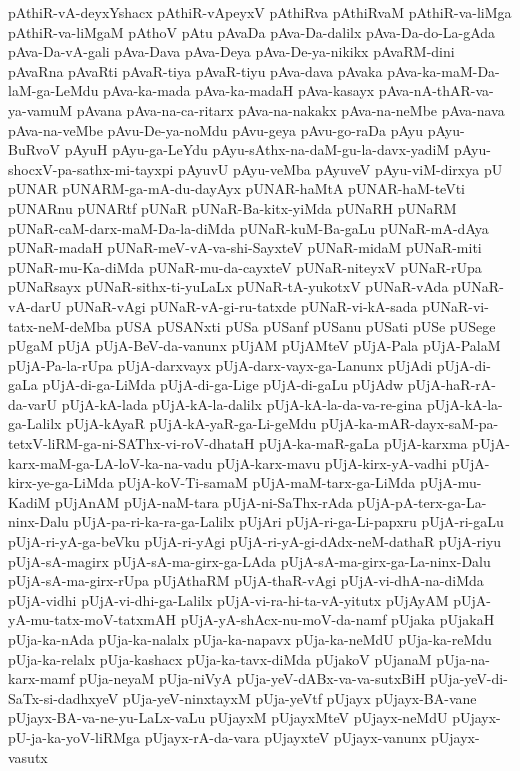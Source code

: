 {pAthiR-vA-deyxYshacx
pAthiR-vApeyxV
pAthiRva
pAthiRvaM
pAthiR-va-liMga
pAthiR-va-liMgaM
pAthoV
pAtu
pAvaDa
pAva-Da-dalilx
pAva-Da-do-La-gAda
pAva-Da-vA-gali
pAva-Dava
pAva-Deya
pAva-De-ya-nikikx
pAvaRM-dini
pAvaRna
pAvaRti
pAvaR-tiya
pAvaR-tiyu
pAva-dava
pAvaka
pAva-ka-maM-Da-laM-ga-LeMdu
pAva-ka-mada
pAva-ka-madaH
pAva-kasayx
pAva-nA-thAR-va-ya-vamuM
pAvana
pAva-na-ca-ritarx
pAva-na-nakakx
pAva-na-neMbe
pAva-nava
pAva-na-veMbe
pAvu-De-ya-noMdu
pAvu-geya
pAvu-go-raDa
pAyu
pAyu-BuRvoV
pAyuH
pAyu-ga-LeYdu
pAyu-sAthx-na-daM-gu-la-davx-yadiM
pAyu-shocxV-pa-sathx-mi-tayxpi
pAyuvU
pAyu-veMba
pAyuveV
pAyu-viM-dirxya
pU
pUNAR
pUNARM-ga-mA-du-dayAyx
pUNAR-haMtA
pUNAR-haM-teVti
pUNARnu
pUNARtf
pUNaR
pUNaR-Ba-kitx-yiMda
pUNaRH
pUNaRM
pUNaR-caM-darx-maM-Da-la-diMda
pUNaR-kuM-Ba-gaLu
pUNaR-mA-dAya
pUNaR-madaH
pUNaR-meV-vA-va-shi-SayxteV
pUNaR-midaM
pUNaR-miti
pUNaR-mu-Ka-diMda
pUNaR-mu-da-cayxteV
pUNaR-niteyxV
pUNaR-rUpa
pUNaRsayx
pUNaR-sithx-ti-yuLaLx
pUNaR-tA-yukotxV
pUNaR-vAda
pUNaR-vA-darU
pUNaR-vAgi
pUNaR-vA-gi-ru-tatxde
pUNaR-vi-kA-sada
pUNaR-vi-tatx-neM-deMba
pUSA
pUSANxti
pUSa
pUSanf
pUSanu
pUSati
pUSe
pUSege
pUgaM
pUjA
pUjA-BeV-da-vanunx
pUjAM
pUjAMteV
pUjA-Pala
pUjA-PalaM
pUjA-Pa-la-rUpa
pUjA-darxvayx
pUjA-darx-vayx-ga-Lanunx
pUjAdi
pUjA-di-gaLa
pUjA-di-ga-LiMda
pUjA-di-ga-Lige
pUjA-di-gaLu
pUjAdw
pUjA-haR-rA-da-varU
pUjA-kA-lada
pUjA-kA-la-dalilx
pUjA-kA-la-da-va-re-gina
pUjA-kA-la-ga-Lalilx
pUjA-kAyaR
pUjA-kA-yaR-ga-Li-geMdu
pUjA-ka-mAR-dayx-saM-pa-tetxV-liRM-ga-ni-SAThx-vi-roV-dhataH
pUjA-ka-maR-gaLa
pUjA-karxma
pUjA-karx-maM-ga-LA-loV-ka-na-vadu
pUjA-karx-mavu
pUjA-kirx-yA-vadhi
pUjA-kirx-ye-ga-LiMda
pUjA-koV-Ti-samaM
pUjA-maM-tarx-ga-LiMda
pUjA-mu-KadiM
pUjAnAM
pUjA-naM-tara
pUjA-ni-SaThx-rAda
pUjA-pA-terx-ga-La-ninx-Dalu
pUjA-pa-ri-ka-ra-ga-Lalilx
pUjAri
pUjA-ri-ga-Li-papxru
pUjA-ri-gaLu
pUjA-ri-yA-ga-beVku
pUjA-ri-yAgi
pUjA-ri-yA-gi-dAdx-neM-dathaR
pUjA-riyu
pUjA-sA-magirx
pUjA-sA-ma-girx-ga-LAda
pUjA-sA-ma-girx-ga-La-ninx-Dalu
pUjA-sA-ma-girx-rUpa
pUjAthaRM
pUjA-thaR-vAgi
pUjA-vi-dhA-na-diMda
pUjA-vidhi
pUjA-vi-dhi-ga-Lalilx
pUjA-vi-ra-hi-ta-vA-yitutx
pUjAyAM
pUjA-yA-mu-tatx-moV-tatxmAH
pUjA-yA-shAcx-nu-moV-da-namf
pUjaka
pUjakaH
pUja-ka-nAda
pUja-ka-nalalx
pUja-ka-napavx
pUja-ka-neMdU
pUja-ka-reMdu
pUja-ka-relalx
pUja-kashacx
pUja-ka-tavx-diMda
pUjakoV
pUjanaM
pUja-na-karx-mamf
pUja-neyaM
pUja-niVyA
pUja-yeV-dABx-va-va-sutxBiH
pUja-yeV-di-SaTx-si-dadhxyeV
pUja-yeV-ninxtayxM
pUja-yeVtf
pUjayx
pUjayx-BA-vane
pUjayx-BA-va-ne-yu-LaLx-vaLu
pUjayxM
pUjayxMteV
pUjayx-neMdU
pUjayx-pU-ja-ka-yoV-liRMga
pUjayx-rA-da-vara
pUjayxteV
pUjayx-vanunx
pUjayx-vasutx
}

